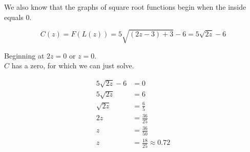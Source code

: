 \documentclass{ximera}
\begin{document}
\begin{example}
\begin{image}
\end{image}





We also know that the graphs of square root functions begin when the inside equals $0$. 

\[
C(z) = F(L(z)) = 5 \sqrt{(2z - 3) + 3} - 6 = 5 \sqrt{2z} - 6
\]


Beginning at $2z = 0$ or $z = 0$. \\

$C$ has a zero, for which we can just solve.




\begin{align*}
5 \sqrt{2z} - 6 &= 0 \\
5 \sqrt{2z}     &= 6 \\
\sqrt{2z}       &= \frac{6}{5} \\
2z            &= \frac{36}{25}  \\
z                  &= \frac{36}{50} \\
z                 &= \frac{18}{25} \approx 0.72
\end{align*}




\end{example}
\end{document}
